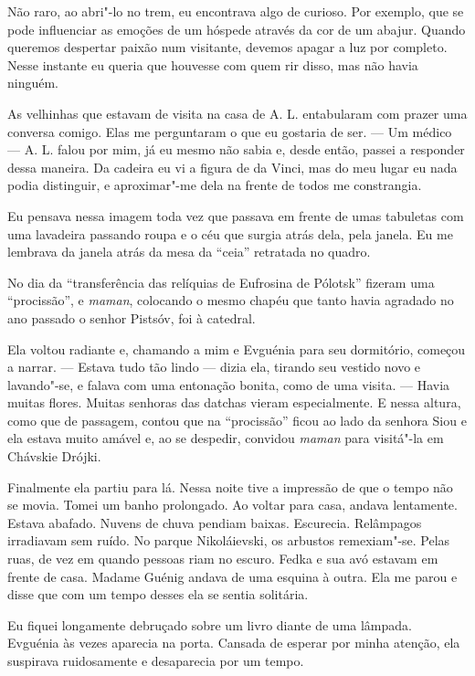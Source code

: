 Não raro, ao abri"-lo no trem, eu encontrava algo de curioso. Por
exemplo, que se pode influenciar as emoções de um hóspede através da cor
de um abajur. Quando queremos despertar paixão num visitante, devemos
apagar a luz por completo. Nesse instante eu queria que houvesse com
quem rir disso, mas não havia ninguém.

As velhinhas que estavam de visita na casa de A. L. entabularam com
prazer uma conversa comigo. Elas me perguntaram o que eu gostaria de
ser. --- Um médico --- A. L. falou por mim, já eu mesmo não sabia e,
desde então, passei a responder dessa maneira. Da cadeira eu vi a figura
de da Vinci, mas do meu lugar eu nada podia distinguir, e aproximar"-me
dela na frente de todos me constrangia.

Eu pensava nessa imagem toda vez que passava em frente de umas tabuletas
com uma lavadeira passando roupa e o céu que surgia atrás dela, pela
janela. Eu me lembrava da janela atrás da mesa da ``ceia'' retratada no
quadro.

No dia da ``transferência das relíquias de Eufrosina de Pólotsk''
fizeram uma ``procissão'', e \emph{maman}, colocando o mesmo chapéu que
tanto havia agradado no ano passado o senhor Pistsóv, foi à catedral.

Ela voltou radiante e, chamando a mim e Evguénia para seu dormitório,
começou a narrar. --- Estava tudo tão lindo --- dizia ela, tirando seu
vestido novo e lavando"-se, e falava com uma entonação bonita, como de
uma visita. --- Havia muitas flores. Muitas senhoras das datchas vieram
especialmente. E nessa altura, como que de passagem, contou que na
``procissão'' ficou ao lado da senhora Siou e ela estava muito amável e,
ao se despedir, convidou \emph{maman} para visitá"-la em Chávskie Drójki.

Finalmente ela partiu para lá. Nessa noite tive a impressão de que o
tempo não se movia. Tomei um banho prolongado. Ao voltar para casa,
andava lentamente. Estava abafado. Nuvens de chuva pendiam baixas.
Escurecia. Relâmpagos irradiavam sem ruído. No parque Nikoláievski, os
arbustos remexiam"-se. Pelas ruas, de vez em quando pessoas riam no
escuro. Fedka e sua avó estavam em frente de casa. Madame Guénig andava
de uma esquina à outra. Ela me parou e disse que com um tempo desses ela
se sentia solitária.

Eu fiquei longamente debruçado sobre um livro diante de uma lâmpada.
Evguénia às vezes aparecia na porta. Cansada de esperar por minha
atenção, ela suspirava ruidosamente e desaparecia por um tempo.

